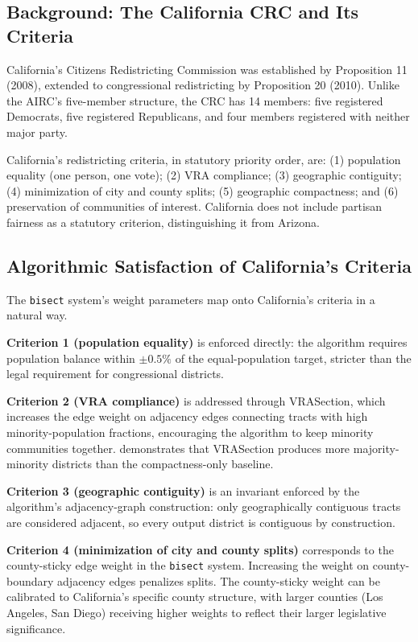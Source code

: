 \label{sec:california}

\subsection{Background: The California CRC and Its Criteria}

California's Citizens Redistricting Commission was established by Proposition
11 (2008), extended to congressional redistricting by Proposition 20 (2010).
Unlike the AIRC's five-member structure, the CRC has 14 members: five
registered Democrats, five registered Republicans, and four members registered
with neither major party.

California's redistricting criteria, in statutory priority order, are:
(1) population equality (one person, one vote); (2) VRA compliance; (3) geographic
contiguity; (4) minimization of city and county splits; (5) geographic
compactness; and (6) preservation of communities of interest.  California
does not include partisan fairness as a statutory criterion, distinguishing it
from Arizona.

\subsection{Algorithmic Satisfaction of California's Criteria}

The \texttt{bisect} system's weight parameters map onto California's criteria
in a natural way.

\textbf{Criterion 1 (population equality)} is enforced directly: the
algorithm requires population balance within $\pm 0.5\%$ of the
equal-population target, stricter than the legal requirement for congressional
districts.

\textbf{Criterion 2 (VRA compliance)} is addressed through VRASection, which
increases the edge weight on adjacency edges connecting tracts with high
minority-population fractions, encouraging the algorithm to keep minority
communities together.  \citet{dellaLibera2026vra} demonstrates that VRASection
produces more majority-minority districts than the compactness-only baseline.

\textbf{Criterion 3 (geographic contiguity)} is an invariant enforced by the
algorithm's adjacency-graph construction: only geographically contiguous
tracts are considered adjacent, so every output district is contiguous by
construction.

\textbf{Criterion 4 (minimization of city and county splits)} corresponds to
the county-sticky edge weight in the \texttt{bisect} system.  Increasing the
weight on county-boundary adjacency edges penalizes splits.  The county-sticky
weight can be calibrated to California's specific county structure, with
larger counties (Los Angeles, San Diego) receiving higher weights to reflect
their larger legislative significance.

